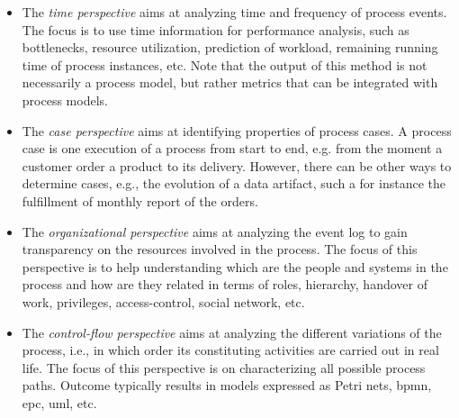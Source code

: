 \documentclass[a4paper,11pt]{article}
\begin{document}
\begin{itemize}
	
	\item The \emph{time perspective} aims at analyzing time and frequency of process events. The focus is to use time information for performance analysis, such as bottlenecks, resource utilization, prediction of workload, remaining running time of process instances, etc. Note that the output of this method is not necessarily a process model, but rather metrics that can be integrated with process models.
	
	\item The \emph{case perspective} aims at identifying properties of process cases. A process case is one execution of a process from start to end, e.g. from the moment a customer order a product to its delivery. However, there can be other ways to determine cases, e.g., the evolution of a data artifact, such a for instance the fulfillment of monthly report of the orders. 
	
	\item The \emph{organizational perspective} aims at analyzing the event log to gain transparency on the resources involved in the process. The focus of this perspective is to help understanding which are the people and systems in the process and how are they related in terms of roles, hierarchy, handover of work, privileges, access-control, social network, etc.
	
	\item The \emph{control-flow perspective} aims at analyzing the different variations of the process, i.e., in which order its constituting activities are carried out in real life. The focus of this perspective is on characterizing all possible process paths. Outcome typically results in models expressed as Petri nets, \gls{bpmn}, \gls{epc}, \gls{uml}, etc.	
	
\end{itemize}


\end{document}
